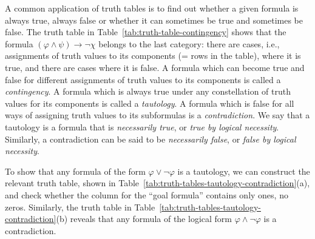 \documentclass[nobib,nofonts]{tufte-handout}
\begin{document}
A common application of truth tables is to find out whether a given formula is always true, always false or whether it can sometimes be true and sometimes be false.
The truth table in Table~\ref{tab:truth-table-contingency} shows that the formula $(\varphi \wedge \psi) \rightarrow \neg \chi$ belongs to the last category: there are cases, i.e., assignments of truth values to its components (= rows in the table), where it is true, and there are cases where it is false.
A formula which can become true and false for different assignments of truth values to its components is called a \emph{contingency}.
A formula which is always true under any constellation of truth values for its components is called a \emph{tautology}.
A formula which is false for all ways of assigning truth values to its subformulas is a \emph{contradiction}.
We say that a tautology is a formula that is \emph{necessarily true}, or \emph{true by logical necessity}.
Similarly, a contradiction can be said to be \emph{necessarily false}, or \emph{false by logical necessity}.

To show that any formula of the form $\varphi \vee \neg \varphi$ is a tautology, we can construct the relevant truth table, shown in Table~\ref{tab:truth-tables-tautology-contradiction}(a), and check whether the column for the ``goal formula'' contains only ones, no zeros.
Similarly, the truth table in Table~\ref{tab:truth-tables-tautology-contradiction}(b) reveals that any formula of the logical form $\varphi \wedge \neg \varphi$ is a contradiction.
\end{document}
